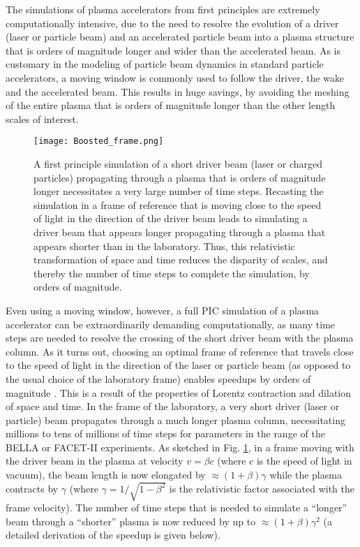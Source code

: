 

The simulations of plasma accelerators from first principles are extremely computationally intensive, due to the need to resolve the evolution of a driver (laser or particle beam) and an accelerated particle beam into a plasma structure that is orders of magnitude longer and wider than the accelerated beam. As is customary in the modeling of particle beam dynamics in standard particle accelerators, a moving window is commonly used to follow the driver, the wake and the accelerated beam. This results in huge savings, by avoiding the meshing of the entire plasma that is orders of magnitude longer than the other length scales of interest.

\begin{figure}
\texttt{[image: Boosted\_frame.png]}
\caption{\label{fig:PIC} A first principle simulation of a short driver beam (laser or charged particles) propagating through a plasma that is orders of magnitude longer necessitates a very large number of time steps. Recasting the simulation in a frame of reference that is moving close to the speed of light in the direction of the driver beam leads to simulating a driver beam that appears longer propagating through a plasma that appears shorter than in the laboratory. Thus, this relativistic transformation of space and time reduces the disparity of scales, and thereby the number of time steps to complete the simulation, by orders of magnitude.}
\end{figure}

Even using a moving window, however, a full PIC simulation of a plasma accelerator can be extraordinarily demanding computationally, as many time steps are needed to resolve the crossing of the short driver beam with the plasma column. As it turns out, choosing an optimal frame of reference that travels close to the speed of light in the direction of the laser or particle beam (as opposed to the usual choice of the laboratory frame) enables speedups by orders of magnitude \cite{Vayprl07,Vaypop2011}. This is a result of the properties of Lorentz contraction and dilation of space and time. In the frame of the laboratory, a very short driver (laser or particle) beam propagates through a much longer plasma column, necessitating millions to tens of millions of time steps for parameters in the range of the BELLA or FACET-II experiments. As sketched in Fig. \ref{fig:PIC}, in a frame moving with the driver beam in the plasma at velocity $v=\beta c$ (where $c$ is the speed of light in vacuum), the beam length is now elongated by $\approx(1+\beta)\gamma$ while the plasma contracts by $\gamma$ (where $\gamma=1/\sqrt{1-\beta^2}$ is the relativistic factor associated with the frame velocity). The number of time steps that is needed to simulate a ``longer'' beam through a ``shorter'' plasma is now reduced by up to $\approx(1+\beta) \gamma^2$ (a detailed derivation of the speedup is given below).

